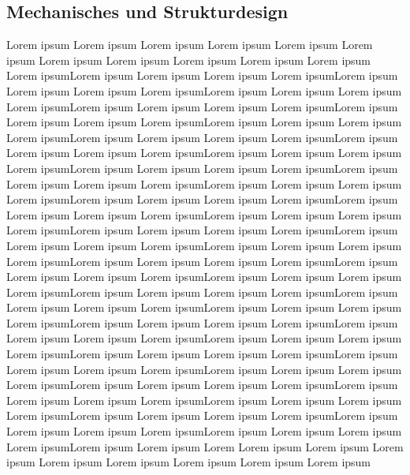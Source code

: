 \subsection{Mechanisches und Strukturdesign}
Lorem ipsum Lorem ipsum Lorem ipsum Lorem ipsum
Lorem ipsum Lorem ipsum Lorem ipsum Lorem ipsum
Lorem ipsum Lorem ipsum Lorem ipsum Lorem ipsumLorem ipsum Lorem ipsum Lorem ipsum Lorem ipsumLorem ipsum Lorem ipsum Lorem ipsum Lorem ipsumLorem ipsum Lorem ipsum Lorem ipsum Lorem ipsumLorem ipsum Lorem ipsum Lorem ipsum Lorem ipsumLorem ipsum Lorem ipsum Lorem ipsum Lorem ipsumLorem ipsum Lorem ipsum Lorem ipsum Lorem ipsumLorem ipsum Lorem ipsum Lorem ipsum Lorem ipsumLorem ipsum Lorem ipsum Lorem ipsum Lorem ipsumLorem ipsum Lorem ipsum Lorem ipsum Lorem ipsumLorem ipsum Lorem ipsum Lorem ipsum Lorem ipsumLorem ipsum Lorem ipsum Lorem ipsum Lorem ipsumLorem ipsum Lorem ipsum Lorem ipsum Lorem ipsumLorem ipsum Lorem ipsum Lorem ipsum Lorem ipsumLorem ipsum Lorem ipsum Lorem ipsum Lorem ipsumLorem ipsum Lorem ipsum Lorem ipsum Lorem ipsumLorem ipsum Lorem ipsum Lorem ipsum Lorem ipsumLorem ipsum Lorem ipsum Lorem ipsum Lorem ipsumLorem ipsum Lorem ipsum Lorem ipsum Lorem ipsumLorem ipsum Lorem ipsum Lorem ipsum Lorem ipsumLorem ipsum Lorem ipsum Lorem ipsum Lorem ipsumLorem ipsum Lorem ipsum Lorem ipsum Lorem ipsumLorem ipsum Lorem ipsum Lorem ipsum Lorem ipsumLorem ipsum Lorem ipsum Lorem ipsum Lorem ipsumLorem ipsum Lorem ipsum Lorem ipsum Lorem ipsumLorem ipsum Lorem ipsum Lorem ipsum Lorem ipsumLorem ipsum Lorem ipsum Lorem ipsum Lorem ipsumLorem ipsum Lorem ipsum Lorem ipsum Lorem ipsumLorem ipsum Lorem ipsum Lorem ipsum Lorem ipsumLorem ipsum Lorem ipsum Lorem ipsum Lorem ipsumLorem ipsum Lorem ipsum Lorem ipsum Lorem ipsumLorem ipsum Lorem ipsum Lorem ipsum Lorem ipsumLorem ipsum Lorem ipsum Lorem ipsum Lorem ipsumLorem ipsum Lorem ipsum Lorem ipsum Lorem ipsumLorem ipsum Lorem ipsum Lorem ipsum Lorem ipsumLorem ipsum Lorem ipsum Lorem ipsum Lorem ipsumLorem ipsum Lorem ipsum Lorem ipsum Lorem ipsumLorem ipsum Lorem ipsum Lorem
Lorem ipsum Lorem ipsum Lorem ipsum Lorem ipsum
Lorem ipsum Lorem ipsum Lorem ipsum Lorem ipsum
